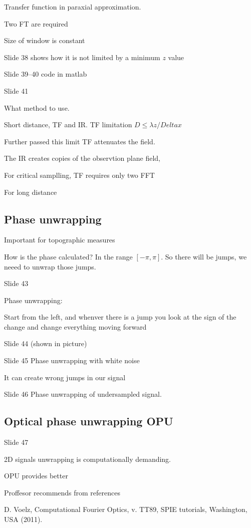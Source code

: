\documentclass[../main/main.tex]{subfiles}
\begin{document}
Transfer function in paraxial approximation.

Two FT are required

Size of window is constant

Slide 38 shows how it is not limited by a minimum $z$ value

Slide 39--40 code in matlab


Slide 41

What method to use.

Short distance, TF and IR. TF limitation $D \leq \lambda z / Delta x$

Further passed this limit TF attenuates the field.

The IR creates copies of the observtion plane field,


For critical samplling, TF requires only two FFT

For long distance



\subsection{Phase unwrapping}

Important for topographic measures

How is the phase calculated? In the range $[-\pi, \pi]$. So there will be jumps, we neeed to unwrap those jumps.

Slide 43

Phase unwrapping:

Start from the left, and whenver there is a jump you look at the sign of the change and change everything moving forward

Slide 44 (shown in picture)

Slide 45 Phase unwrapping with white noise

It can create wrong jumps in our signal

Slide 46 Phase unwrapping of undersampled signal.


\subsection{Optical phase unwrapping OPU}
Slide 47

2D signals unwrapping is computationally demanding.

OPU provides better


Proffesor recommends from references

D. Voelz, Computational Fourier Optics, v. TT89, SPIE tutorials, Washington, USA (2011).
\end{document}
